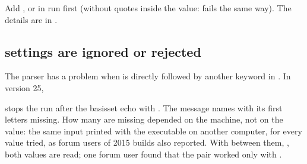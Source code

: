 \documentclass[letterpaper,10pt,english,openany,oneside]{sphinxmanual}
\begin{document}
\sphinxAtStartPar
{} Add , or in  run  first (without quotes inside the value:
 fails the same way). The details are in {\hyperref[\detokenize{start/running:running-scratch}]{}}.




\subsection{ settings are ignored or rejected}
\label{\detokenize{troubleshooting/common-problems:scf-settings-are-ignored-or-rejected}}\label{\detokenize{troubleshooting/common-problems:troubleshooting-scf-parser}}
\sphinxAtStartPar
The parser has a problem when {\hyperref[\detokenize{reference/scf:scf-convergence}]{}} is directly followed by another keyword in
{\hyperref[\detokenize{reference/scf:group-scf}]{}}. In version 25,

\begin{sphinxVerbatim}[commandchars=\\\{\}]
\end{sphinxVerbatim}

\sphinxAtStartPar
stops the run after the basis\sphinxhyphen{}set echo with . The message names
 with its first letters missing. How many are missing depended on the machine, not on the value: the same
input printed  with the  executable on another computer, for every value tried, as
forum users of 2015 builds also reported. With
{\hyperref[\detokenize{reference/scf:scf-procedure}]{}} between them, , both
values are read; one forum user found that the pair worked only with .
\end{document}
